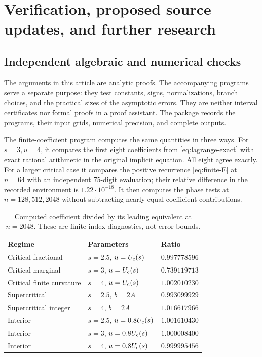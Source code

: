 \section{Verification, proposed source updates, and further research}
\label{sec:verification-research}

\subsection{Independent algebraic and numerical checks}

The arguments in this article are analytic proofs.  The accompanying
programs serve a separate purpose: they test constants, signs,
normalizations, branch choices, and the practical sizes of the
asymptotic errors.  They are neither interval certificates nor
formal proofs in a proof assistant.  The package records the programs,
their input grids, numerical precision, and complete outputs.

The finite-coefficient program computes the same quantities in three
ways.  For $s=3,u=4$, it compares the first eight coefficients from
\eqref{eq:lagrange-exact} with exact rational arithmetic in the original
implicit equation.  All eight agree exactly.  For a larger critical
case it compares the positive recurrence \eqref{eq:finite-E} at $n=64$
with an independent 75-digit evaluation; their relative difference
in the recorded environment is $1.22\cdot10^{-18}$.
It then computes the phase tests at $n=128,512,2048$ without
subtracting nearly equal coefficient contributions.

\begin{table}[htbp]
\centering
\caption{Computed coefficient divided by its leading equivalent
at $n=2048$.  These are finite-index diagnostics, not error bounds.}
\label{tab:phase-checks}
\begin{tabular}{@{}lll@{}}
\toprule
Regime & Parameters & Ratio\\
\midrule
Critical fractional & $s=2.5$, $u=U_{\mathrm c}(s)$ & $0.997778596$\\
Critical marginal & $s=3$, $u=U_{\mathrm c}(s)$ & $0.739119713$\\
Critical finite curvature & $s=4$, $u=U_{\mathrm c}(s)$ & $1.002010230$\\
Supercritical & $s=2.5$, $b=2A$ & $0.993099929$\\
Supercritical integer & $s=4$, $b=2A$ & $1.016617966$\\
Interior & $s=2.5$, $u=0.8U_{\mathrm c}(s)$ & $1.001610430$\\
Interior & $s=3$, $u=0.8U_{\mathrm c}(s)$ & $1.000008400$\\
Interior & $s=4$, $u=0.8U_{\mathrm c}(s)$ & $0.999995456$\\
\bottomrule
\end{tabular}
\end{table}

